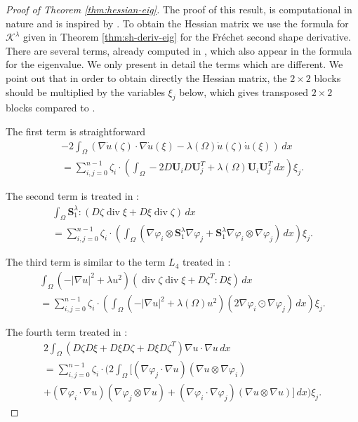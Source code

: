 \documentclass[JEP,XML,SOM,Unicode,ThmDefs,NoFloatCountersInSection,published]{cedram}
\theoremstyle{plain}
\theoremstyle{definition}
\newcommand{\di}{\operatorname{div}}
\newcommand{\bo}[1]{{\boldsymbol#1}}
\begin{document}
\begin{proof}[Proof of Theorem \ref{thm:hessian-eig}]
The proof of this result, is computational in nature and is inspired by \cite[Prop.\,14]{laurain2ndDeriv}. To obtain the Hessian matrix we use the formula for $\mathcal K^\lambda$ given in Theorem \ref{thm:sh-deriv-eig} for the Fréchet second shape derivative. There are several terms, already computed in \cite[App.\,A]{laurain2ndDeriv}, which also appear in the formula for the eigenvalue. We only present in detail the terms which are different. We point out that in order to obtain directly the Hessian matrix, the $2\times 2$ blocks should be multiplied by the variables $\xi_j$ below, which gives transposed $2\times 2$ blocks compared to \cite{laurain2ndDeriv}.

The first term is straightforward
\vspace*{-5pt}
\begin{multline*}-2 \int_\Omega (\nabla \dot u(\zeta) \cdot \nabla \dot u(\xi) -\lambda(\Omega) \dot u(\zeta) \dot u(\xi))\, dx \\
= \sum_{i,j=0}^{n-1} \zeta_i \cdot \left(\int_\Omega -2D\bo U_i D\bo U_j^T + \lambda(\Omega)\bo U_i \bo U_j^T\, dx\right)\xi_j.
\end{multline*}

The second term is treated in \cite[term $L_3$, p.\,38]{laurain2ndDeriv}:
\vspace*{-5pt}
\begin{multline*} \int_{\Omega} \bo S_1^\lambda :(D\zeta \di \xi+D\xi \di \zeta)\, dx \\
= \sum_{i,j=0}^{n-1} \zeta_i\cdot \left(\int_\Omega \left(\nabla \varphi_i \otimes \bo S_1^\lambda \nabla \varphi_j + \bo S_1^\lambda \nabla \varphi_i \otimes \nabla \varphi_j\right) \, dx\right)\xi_j.
\end{multline*}

The third term is similar to the term $L_4$ treated in \cite[p.\,39]{laurain2ndDeriv}:
\vspace*{-5pt}
\begin{multline*}
\int_\Omega (-|\nabla u|^2+\lambda u^2)(\di \zeta \di \xi+D\zeta^T:D\xi)\, dx\\ =
\sum_{i,j=0}^{n-1} \zeta_i \cdot \left(\int_\Omega \left(-|\nabla u|^2+\lambda(\Omega) u^2\right) (2 \nabla \varphi_i \odot \nabla \varphi_j)\, dx \right) \xi_j.
\end{multline*}

The fourth term treated in \cite[$L_5$ p.\,39]{laurain2ndDeriv}:
\vspace*{-5pt}
\begin{multline*}
2\int_\Omega (D\zeta D\xi +D\xi D\zeta + D\xi D\zeta^T)\nabla u \cdot \nabla u\, dx \\= \sum_{i,j=0}^{n-1} \zeta_i \cdot \bigg(2\int_\Omega\big[ (\nabla \varphi_j\cdot \nabla u)(\nabla u \otimes \nabla \varphi_i)\\ +(\nabla \varphi_i \cdot \nabla u)(\nabla \varphi_j\otimes \nabla u) +(\nabla \varphi_i \cdot \nabla \varphi_j)(\nabla u \otimes \nabla u)\big] \, dx\bigg)\xi_j.
\end{multline*}


\end{proof}
\end{document}
